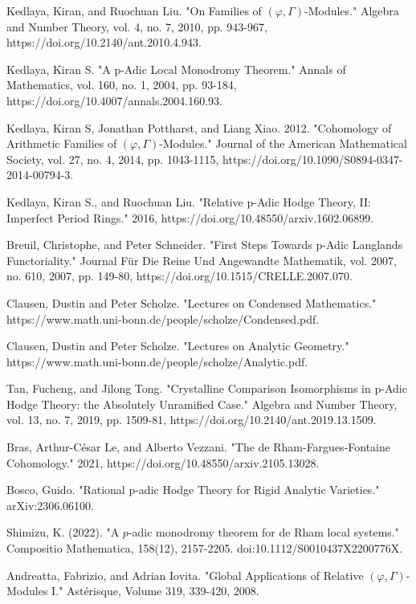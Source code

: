 \documentclass[12pt]{book}
\theoremstyle{definition}
\begin{document}
\begin{thebibliography}{}
 Kedlaya, Kiran, and Ruochuan Liu. "On Families of $(\varphi, \Gamma)$-Modules." Algebra and Number Theory, vol. 4, no. 7, 2010, pp. 943-967, https://doi.org/10.2140/ant.2010.4.943.

 Kedlaya, Kiran S. "A p-Adic Local Monodromy Theorem." Annals of Mathematics, vol. 160, no. 1, 2004, pp. 93-184, https://doi.org/10.4007/annals.2004.160.93.

 Kedlaya, Kiran S, Jonathan Pottharst, and Liang Xiao. 2012. "Cohomology of Arithmetic Families of $(\varphi,\Gamma)$-Modules." Journal of the American Mathematical Society, vol. 27, no. 4, 2014, pp. 1043-1115, https://doi.org/10.1090/S0894-0347-2014-00794-3.
 
 Kedlaya, Kiran S., and Ruochuan Liu. "Relative p-Adic Hodge Theory, II: Imperfect Period Rings." 2016, https://doi.org/10.48550/arxiv.1602.06899.

 Breuil, Christophe, and Peter Schneider. "First Steps Towards p-Adic Langlands Functoriality." Journal F\"ur Die Reine Und Angewandte Mathematik, vol. 2007, no. 610, 2007, pp. 149-80, https://doi.org/10.1515/CRELLE.2007.070.

 Clausen, Dustin and Peter Scholze. "Lectures on Condensed Mathematics." https://www.math.uni-bonn.de/people/scholze/Condensed.pdf.

 Clausen, Dustin and Peter Scholze. "Lectures on Analytic Geometry." https://www.math.uni-bonn.de/people/scholze/Analytic.pdf.

 Tan, Fucheng, and Jilong Tong. "Crystalline Comparison Isomorphisms in p-Adic Hodge Theory: the Absolutely Unramified Case." Algebra and Number Theory, vol. 13, no. 7, 2019, pp. 1509-81, https://doi.org/10.2140/ant.2019.13.1509.

 Bras, Arthur-C\'esar Le, and Alberto Vezzani. "The de Rham-Fargues-Fontaine Cohomology." 2021, https://doi.org/10.48550/arxiv.2105.13028.

 Bosco, Guido. "Rational p-adic Hodge Theory for Rigid Analytic Varieties." arXiv:2306.06100. 

 Shimizu, K. (2022). "A $p$-adic monodromy theorem for de Rham local systems." Compositio Mathematica, 158(12), 2157-2205. doi:10.1112/S0010437X2200776X.

 Andreatta, Fabrizio, and Adrian Iovita. "Global Applications of Relative $(\varphi,\Gamma)$-Modules I." Ast\'erisque, Volume 319, 339-420, 2008.


\end{thebibliography}
\end{document}
